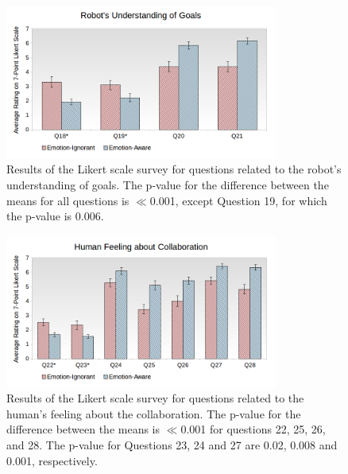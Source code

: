 \documentclass[12pt]{report}
\begin{document}
\begin{figure}
\centering
\includegraphics[width=0.8\textwidth]{figure/Overall-Goals.png}
\caption{Results of the Likert scale survey for questions related to the robot's
understanding of goals. The p-value for the difference between the means for all
questions is $\ll$0.001, except Question 19, for which the p-value is 0.006.}
\label{fig:overall-goals}
\end{figure}

\begin{figure}
\centering
\includegraphics[width=0.8\textwidth]{figure/Overall-Collaboration.png}
\caption{Results of the Likert scale survey for questions related to the human's
feeling about the collaboration. The p-value for the difference between the
means is $\ll$0.001 for questions 22, 25, 26, and 28. The p-value for Questions
23, 24 and 27 are 0.02, 0.008 and 0.001, respectively.}
\label{fig:overall-collaboration}
\end{figure}
\end{document}
